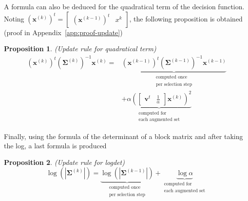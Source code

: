 \documentclass[journal,peerreview,onecolumn]{IEEEtran}
\newtheorem{prop}{Proposition}
\begin{document}
        A formula can also be deduced for the quadratical term of the decision function. Noting $(\mathbf{x}^{(k)})^t = \left[\begin{array}{cc} (\mathbf{x}^{(k-1)})^t   & x^k \end{array}\right]$, the following proposition is obtained (proof in Appendix~\ref{app:proof-update})
        \begin{prop}
        \label{eq:update-quad}
            (Update rule for quadratical term)
            \begin{align*}
                (\mathbf{x}^{(k)})^t (\boldsymbol{\Sigma}^{(k)})^{-1} \mathbf{x}^{(k)} = &\underbrace{(\mathbf{x}^{(k-1)})^t (\boldsymbol{\Sigma}^{(k-1)})^{-1} \mathbf{x}^{(k-1)}}_{\substack{\text{computed once}\\ \text{per selection step}}} \\
                &+ \underbrace{\alpha ( \left[\begin{array}{cc} \mathbf{v}^t & \frac{1}{\alpha} \end{array}\right] \mathbf{x}^{(k)} )^2}_{\substack{\text{computed for} \\ \text{each augmented set}}}
            \end{align*}
        \end{prop}

        Finally, using the formula of the determinant of a block matrix and after taking the log, a last formula is produced
        \begin{prop}
        \label{eq:update-log}
            (Update rule for logdet)
            \begin{equation*}
                \log \left(|\boldsymbol{\Sigma}^{(k)}|\right) = \underbrace{\log \left(|\boldsymbol{\Sigma}^{(k-1)}|\right)}_{\substack{\text{computed once}\\ \text{per selection step}}} + \underbrace{\log \alpha}_{\substack{\text{computed for} \\ \text{each augmented set}}}
            \end{equation*}
        \end{prop}
\end{document}

